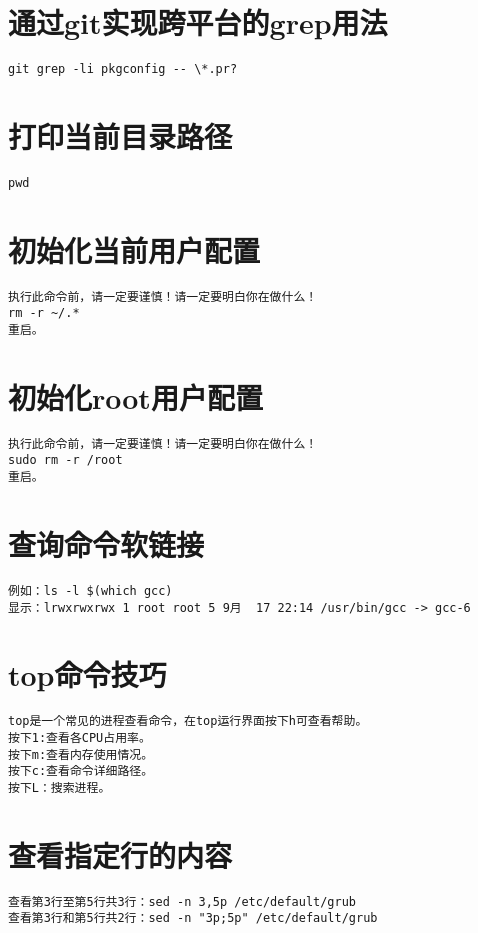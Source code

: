 \documentclass[a4paper,fontset=fandol,zihao=-4,linespread=1.2]{ctexbook}
\begin{document}
\section{通过git实现跨平台的grep用法}
\begin{lstlisting}
git grep -li pkgconfig -- \*.pr?
\end{lstlisting}

\section{打印当前目录路径}
\begin{lstlisting}
pwd
\end{lstlisting}

\section{初始化当前用户配置}
\begin{lstlisting}
执行此命令前，请一定要谨慎！请一定要明白你在做什么！
rm -r ~/.*
重启。
\end{lstlisting}

\section{初始化root用户配置}
\begin{lstlisting}
执行此命令前，请一定要谨慎！请一定要明白你在做什么！
sudo rm -r /root
重启。
\end{lstlisting}

\section{查询命令软链接}
\begin{lstlisting}
例如：ls -l $(which gcc)
显示：lrwxrwxrwx 1 root root 5 9月  17 22:14 /usr/bin/gcc -> gcc-6
\end{lstlisting}

\section{top命令技巧}
\begin{lstlisting}
top是一个常见的进程查看命令，在top运行界面按下h可查看帮助。
按下1:查看各CPU占用率。
按下m:查看内存使用情况。
按下c:查看命令详细路径。
按下L：搜索进程。
\end{lstlisting}

\section{查看指定行的内容}
\begin{lstlisting}
查看第3行至第5行共3行：sed -n 3,5p /etc/default/grub
查看第3行和第5行共2行：sed -n "3p;5p" /etc/default/grub
\end{lstlisting}
\end{document}
